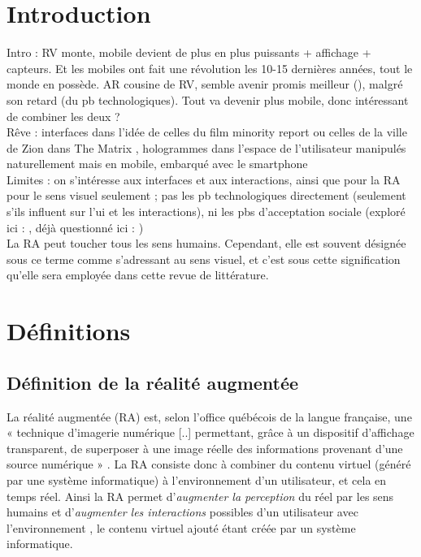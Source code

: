 \section*{Introduction}
Intro : RV monte, mobile devient de plus en plus puissants + affichage + capteurs. Et les mobiles ont fait une révolution les 10-15 dernières années, tout le monde en possède. AR cousine de RV, semble avenir promis meilleur (\cite{BelliniChenSugiyamaEtAl2016}), malgré son retard (du pb technologiques). Tout va devenir plus mobile, donc intéressant de combiner les deux ?
\cite{DeSaChurchill2013} \\
Rêve : interfaces dans l'idée de celles du film minority report ou celles de la ville de Zion dans The Matrix \cite{WachowskiSilver2003}, hologrammes dans l'espace de l'utilisateur manipulés naturellement mais en mobile, embarqué avec le smartphone \\
Limites : on s'intéresse aux interfaces et aux interactions, ainsi que pour la RA pour le sens visuel seulement ; pas les pb technologiques directement (seulement s'ils influent sur l'ui et les interactions), ni les pbs d'acceptation sociale (exploré ici : \cite{KoelleKranzMoeller2015}, déjà questionné ici : \cite{AzumaBaillotBehringerEtAl2001}) \\

La RA peut toucher tous les sens humains. Cependant, elle est souvent désignée sous ce terme comme s'adressant au sens visuel, et c'est sous cette signification qu'elle sera employée dans cette revue de littérature.


\section*{Définitions}
\subsection*{Définition de la réalité augmentée}
La réalité augmentée (RA) est, selon l'office québécois de la langue française, une « technique d'imagerie numérique [..] permettant, grâce à un dispositif d'affichage transparent, de superposer à une image réelle des informations provenant d'une source numérique » \citep{OfficeQuebecoisLangueFrancaiseRA2015}. La RA consiste donc à combiner du contenu virtuel (généré par une système informatique) à l'environnement d'un utilisateur, et cela en temps réel. Ainsi la RA permet d'\emph{augmenter la perception} du réel par les sens humains et d'\emph{augmenter les interactions} possibles d'un utilisateur avec l'environnement \citep{Azuma1997}, le contenu virtuel ajouté étant créée par un système informatique.

